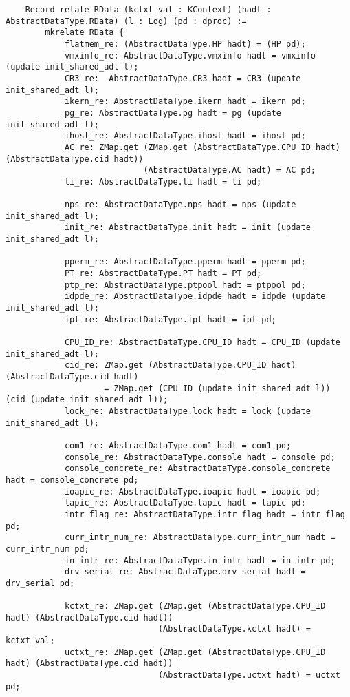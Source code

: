 \begin{lstlisting}
    Record relate_RData (kctxt_val : KContext) (hadt : AbstractDataType.RData) (l : Log) (pd : dproc) :=
        mkrelate_RData {
            flatmem_re: (AbstractDataType.HP hadt) = (HP pd);
            vmxinfo_re: AbstractDataType.vmxinfo hadt = vmxinfo (update init_shared_adt l);
            CR3_re:  AbstractDataType.CR3 hadt = CR3 (update init_shared_adt l);
            ikern_re: AbstractDataType.ikern hadt = ikern pd;
            pg_re: AbstractDataType.pg hadt = pg (update init_shared_adt l);
            ihost_re: AbstractDataType.ihost hadt = ihost pd;
            AC_re: ZMap.get (ZMap.get (AbstractDataType.CPU_ID hadt) (AbstractDataType.cid hadt))
                            (AbstractDataType.AC hadt) = AC pd;
            ti_re: AbstractDataType.ti hadt = ti pd;
            
            nps_re: AbstractDataType.nps hadt = nps (update init_shared_adt l);
            init_re: AbstractDataType.init hadt = init (update init_shared_adt l);

            pperm_re: AbstractDataType.pperm hadt = pperm pd;
            PT_re: AbstractDataType.PT hadt = PT pd;
            ptp_re: AbstractDataType.ptpool hadt = ptpool pd;
            idpde_re: AbstractDataType.idpde hadt = idpde (update init_shared_adt l);
            ipt_re: AbstractDataType.ipt hadt = ipt pd;

            CPU_ID_re: AbstractDataType.CPU_ID hadt = CPU_ID (update init_shared_adt l);
            cid_re: ZMap.get (AbstractDataType.CPU_ID hadt) (AbstractDataType.cid hadt)
                    = ZMap.get (CPU_ID (update init_shared_adt l)) (cid (update init_shared_adt l));
            lock_re: AbstractDataType.lock hadt = lock (update init_shared_adt l);

            com1_re: AbstractDataType.com1 hadt = com1 pd;
            console_re: AbstractDataType.console hadt = console pd;
            console_concrete_re: AbstractDataType.console_concrete hadt = console_concrete pd;
            ioapic_re: AbstractDataType.ioapic hadt = ioapic pd;
            lapic_re: AbstractDataType.lapic hadt = lapic pd;
            intr_flag_re: AbstractDataType.intr_flag hadt = intr_flag pd;
            curr_intr_num_re: AbstractDataType.curr_intr_num hadt = curr_intr_num pd;
            in_intr_re: AbstractDataType.in_intr hadt = in_intr pd;
            drv_serial_re: AbstractDataType.drv_serial hadt = drv_serial pd;

            kctxt_re: ZMap.get (ZMap.get (AbstractDataType.CPU_ID hadt) (AbstractDataType.cid hadt)) 
                               (AbstractDataType.kctxt hadt) = kctxt_val;
            uctxt_re: ZMap.get (ZMap.get (AbstractDataType.CPU_ID hadt) (AbstractDataType.cid hadt))
                               (AbstractDataType.uctxt hadt) = uctxt pd;


\end{lstlisting}
